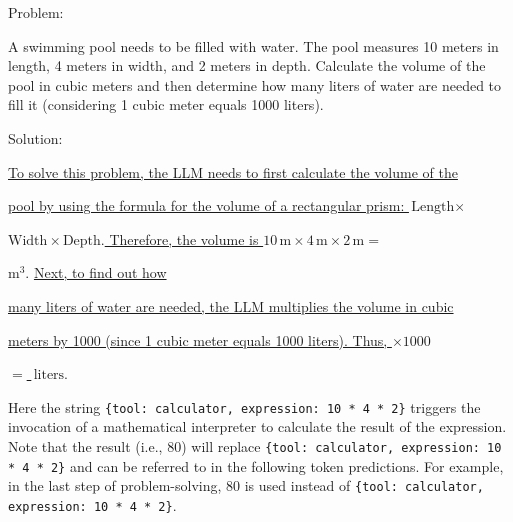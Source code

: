 \vspace{0.5em}
\begin{tcolorbox}

\begingroup
\setlength{\leftskip}{2em}
\setlength{\rightskip}{2em}

Problem:

\vspace{0.2em}

A swimming pool needs to be filled with water. The pool measures 10 meters in length, 4 meters in width, and 2 meters in depth. Calculate the volume of the pool in cubic meters and then determine how many liters of water are needed to fill it (considering 1 cubic meter equals 1000 liters).
\vspace{0.5em}

Solution:

\underline{To solve this problem, the LLM needs to first calculate the volume of the}

\underline{pool by using the formula for the volume of a rectangular prism: $\text{Length} \times$}

\underline{$\text{Width} \times \text{Depth}.$ Therefore, the volume is $10 \, \text{m} \times 4 \, \text{m} \times 2 \, \text{m} =$ }

 $\text{m}^3$. \underline{Next, to find out how}

\underline{many  liters of water are needed, the LLM multiplies the volume in cubic}

\underline{meters by 1000 (since 1 cubic meter equals 1000 liters). Thus,  $ \times 1000$}

\underline{$= $  $\, \text{liters}.$}

\endgroup

\end{tcolorbox}
\vspace{0.5em}

\noindent Here the string \texttt{\{tool: calculator, expression: 10 * 4 * 2\}} triggers the invocation of a mathematical interpreter to calculate the result of the expression. Note that the result (i.e., 80) will replace \texttt{\{tool: calculator, expression: 10 * 4 * 2\}} and can be referred to in the following token predictions. For example, in the last step of problem-solving, 80 is used instead of \texttt{\{tool: calculator, expression: 10 * 4 * 2\}}.

